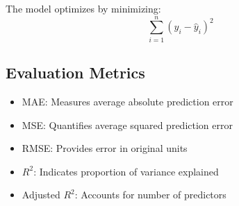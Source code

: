 \documentclass[12pt]{article}
\begin{document}
The model optimizes by minimizing:
\[
\sum_{i=1}^n (y_i - \hat{y}_i)^2
\]

\subsection*{Evaluation Metrics}
\begin{itemize}
  \item MAE: Measures average absolute prediction error
  \item MSE: Quantifies average squared prediction error
  \item RMSE: Provides error in original units
  \item $R^2$: Indicates proportion of variance explained
  \item Adjusted $R^2$: Accounts for number of predictors
\end{itemize}
\end{document}
